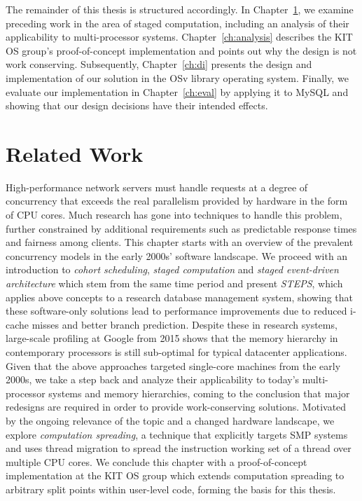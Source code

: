 \documentclass[12pt,a4paper]{book}
\begin{document}
The remainder of this thesis is structured accordingly.
In Chapter~\ref{ch:relwork}, we examine preceding work in the area of staged computation, including an analysis of their applicability to multi-processor systems.
Chapter~\ref{ch:analysis} describes the KIT OS group's proof-of-concept implementation and points out why the design is not work conserving.
Subsequently, Chapter~\ref{ch:di} presents the design and implementation of our solution in the OSv library operating system.
Finally, we evaluate our implementation in Chapter~\ref{ch:eval} by applying it to MySQL and showing that our design decisions have their intended effects.


\chapter{Related Work}\label{ch:relwork}
High-performance network servers must handle requests at a degree of concurrency that exceeds the real parallelism provided by hardware in the form of CPU cores.
Much research has gone into techniques to handle this problem, further constrained by additional requirements such as predictable response times and fairness among clients.
This chapter starts with an overview of the prevalent concurrency models in the early 2000s' software landscape.
We proceed with an introduction to \emph{cohort scheduling}, \emph{staged computation} and \emph{staged event-driven architecture} which stem from the same time period
and present \emph{STEPS}, which applies above concepts to a research database management system, showing that these software-only solutions lead to performance improvements due to reduced i-cache misses and better branch prediction.
Despite these in research systems, large-scale profiling at Google from 2015 shows that the memory hierarchy in contemporary processors is still sub-optimal for typical datacenter applications.
Given that the above approaches targeted single-core machines from the early 2000s, we take a step back and analyze their applicability to today's multi-processor systems and memory hierarchies,
coming to the conclusion that major redesigns are required in order to provide work-conserving solutions.
Motivated by the ongoing relevance of the topic and a changed hardware landscape, we explore \emph{computation spreading}, a technique that explicitly targets SMP systems and uses thread migration to spread the instruction working set of a thread over multiple CPU cores.
We conclude this chapter with a proof-of-concept implementation at the KIT OS group which extends computation spreading to arbitrary split points within user-level code, forming the basis for this thesis.
\end{document}
